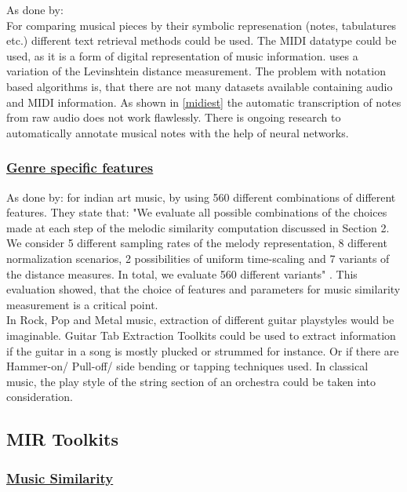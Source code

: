 As done by: \cite{midi1}\\
For comparing musical pieces by their symbolic represenation (notes, tabulatures etc.) different text retrieval methods could be used. The MIDI datatype could be used, as it is a form of digital representation of music information. 
\cite{midi1} uses a variation of the Levinshtein distance measurement. 
The problem with notation based algorithms is, that there are not many datasets available containing audio and MIDI information.
As shown in \ref{midiest} the automatic transcription of notes from raw audio does not work flawlessly. 
There is ongoing research to automatically annotate musical notes with the help of neural networks.\cite{crepe1}

\subsubsection{\underline{Genre specific features}}

As done by: \cite{mussim1} for indian art music, by using 560 different combinations of different features. They state that: "We evaluate all possible combinations of the choices made at each step of the melodic similarity computation discussed in Section 2.  We consider 5 different sampling rates of the melody representation, 8 different normalization scenarios, 2 possibilities of uniform time-scaling and 7 variants of the distance measures.  In total, we evaluate 560 different variants" \cite[p. 3]{mussim1}. This evaluation showed, that the choice of features and parameters for music similarity measurement is a critical point.\\
In Rock, Pop and Metal music, extraction of different guitar playstyles would be imaginable. Guitar Tab Extraction \cite{guitext1} Toolkits could be used to extract information if the guitar in a song is mostly plucked or strummed for instance. Or if there are Hammer-on/ Pull-off/ side bending or tapping techniques used.
In classical music, the play style of the string section of an orchestra could be taken into consideration. 

\subsection{MIR Toolkits}\label{mirtoolkit}
\subsubsection{\underline{Music Similarity}}

